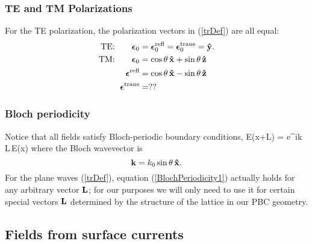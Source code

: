 \documentclass[letterpaper]{article}
\newcommand{\vbEps}{\boldsymbol{\epsilon}}
\begin{document}
\subsubsection*{TE and TM Polarizations} 

For the TE polarization, the polarization vectors in 
(\ref{trDef}) are all equal:
\begin{align*}
 \text{TE:} 
   \qquad \vbEps_0&=\vbEps_0\sups{refl}=\vbEps_0\sups{trans}=\vbhat{y}.
\\
 \text{TM:} 
   \qquad \vbEps_0&=\cos\theta\,\vbhat{x} + \sin\theta\,\vbhat{z} \\
 \vbEps\sups{refl}&=\cos\theta\,\vbhat{x} - \sin\theta\,\vbhat{z} \\
\vbEps\sups{trans}&=??
\end{align*}

\subsubsection*{Bloch periodicity} 

Notice that all fields satisfy Bloch-periodic boundary conditions,
{\vb E(\vb x+\vb L) = e^{i\vb k \cdot \vb L}\,\vb E(\vb x)}
where the Bloch wavevector is 
$$\mathbf{k}=k_0 \sin\theta \, \mathbf{\hat x}.$$
For the plane waves (\ref{trDef}), equation (\ref{BlochPeriodicity1})
actually holds for any arbitrary vector $\mathbf{L}$; for our 
purposes we will only need to use it for certain special
vectors $\mathbf{L}$ determined by the structure of the lattice in
our PBC geometry.

\subsection*{Fields from surface currents}
\end{document}
